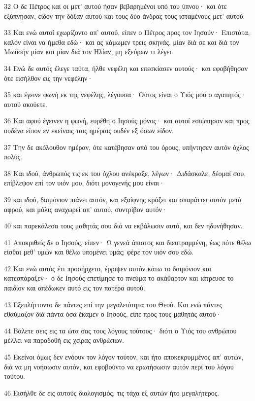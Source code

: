 \par 32 Ο δε Πέτρος και οι μετ' αυτού ήσαν βεβαρημένοι υπό του ύπνου· και ότε εξύπνησαν, είδον την δόξαν αυτού και τους δύο άνδρας τους ισταμένους μετ' αυτού.
\par 33 Και ενώ αυτοί εχωρίζοντο απ' αυτού, είπεν ο Πέτρος προς τον Ιησούν· Επιστάτα, καλόν είναι να ήμεθα εδώ· και ας κάμωμεν τρεις σκηνάς, μίαν διά σε και διά τον Μωϋσήν μίαν και μίαν διά τον Ηλίαν, μη εξεύρων τι λέγει.
\par 34 Ενώ δε αυτός έλεγε ταύτα, ήλθε νεφέλη και επεσκίασεν αυτούς· και εφοβήθησαν ότε εισήλθον εις την νεφέλην·
\par 35 και έγεινε φωνή εκ της νεφέλης, λέγουσα· Ούτος είναι ο Υιός μου ο αγαπητός· αυτού ακούετε.
\par 36 Και αφού έγεινεν η φωνή, ευρέθη ο Ιησούς μόνος· και αυτοί εσιώπησαν και προς ουδένα είπον εν εκείναις ταις ημέραις ουδέν εξ όσων είδον.
\par 37 Την δε ακόλουθον ημέραν, ότε κατέβησαν από του όρους, υπήντησεν αυτόν όχλος πολύς.
\par 38 Και ιδού, άνθρωπός τις εκ του όχλου ανέκραξε, λέγων· Διδάσκαλε, δέομαί σου, επίβλεψον επί τον υιόν μου, διότι μονογενής μου είναι·
\par 39 και ιδού, δαιμόνιον πιάνει αυτόν, και εξαίφνης κράζει και σπαράττει αυτόν μετά αφρού, και μόλις αναχωρεί απ' αυτού, συντρίβον αυτόν·
\par 40 και παρεκάλεσα τους μαθητάς σου διά να εκβάλωσιν αυτό, και δεν ηδυνήθησαν.
\par 41 Αποκριθείς δε ο Ιησούς, είπεν· Ω γενεά άπιστος και διεστραμμένη, έως πότε θέλω είσθαι μεθ' υμών και θέλω υπομένει υμάς; φέρε τον υιόν σου εδώ.
\par 42 Και ενώ αυτός έτι προσήρχετο, έρριψεν αυτόν κάτω το δαιμόνιον και κατεσπάραξεν· ο δε Ιησούς επετίμησε το πνεύμα το ακάθαρτον και ιάτρευσε το παιδίον και απέδωκεν αυτό εις τον πατέρα αυτού.
\par 43 Εξεπλήττοντο δε πάντες επί την μεγαλειότητα του Θεού. Και ενώ πάντες εθαύμαζον διά πάντα όσα έκαμεν ο Ιησούς, είπε προς τους μαθητάς αυτού·
\par 44 Βάλετε σεις εις τα ώτα σας τους λόγους τούτους· διότι ο Υιός του ανθρώπου μέλλει να παραδοθή εις χείρας ανθρώπων.
\par 45 Εκείνοι όμως δεν ενόουν τον λόγον τούτον, και ήτο αποκεκρυμμένος απ' αυτών, διά να μη νοήσωσιν αυτόν, και εφοβούντο να ερωτήσωσιν αυτόν περί του λόγου τούτου.
\par 46 Εισήλθε δε εις αυτούς διαλογισμός, τις τάχα εξ αυτών ήτο μεγαλήτερος.
